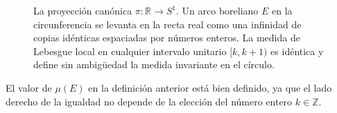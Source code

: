 \begin{figure}[htbp]
	\caption{La proyección canónica $\pi: \mathbb{R} \to S^1$. Un arco boreliano $E$ en la circunferencia se levanta en la recta real como una infinidad de copias idénticas espaciadas por números enteros. La medida de Lebesgue local en cualquier intervalo unitario $[k, k+1)$ es idéntica y define sin ambigüedad la medida invariante en el círculo.}
	\label{fig:definicion_medida_cociente}
\end{figure}


\begin{proposicion}
	El valor de $\mu(E)$ en la definición anterior está bien definido, ya que el lado derecho de la igualdad no depende de la elección del número entero $k \in \mathbb{Z}$.
\end{proposicion}


